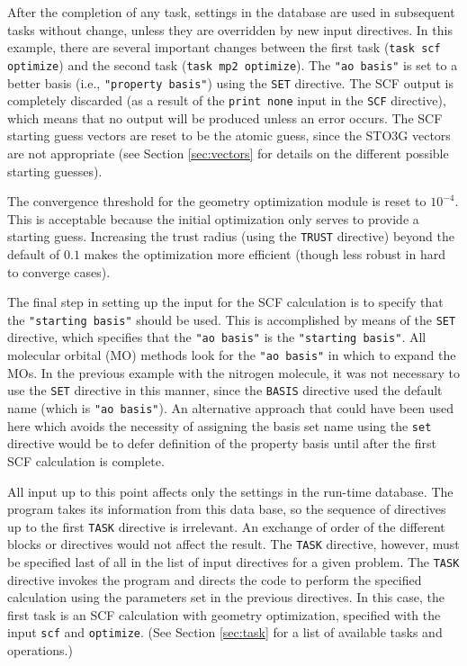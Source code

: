 After the completion of any task, settings in the database are used
in subsequent tasks without change, unless they are overridden by new
input directives.  In this example, there are several important
changes between the first task (\verb+task scf optimize+) and the
second task (\verb+task mp2 optimize+).  The {\tt "ao basis"} is set
to a better basis (i.e., {\tt "property basis"}) using the \verb+SET+
directive.  The SCF output is completely discarded (as a result of the
{\tt print none} input in the {\tt SCF} directive), which means that
no output will be produced unless an error occurs.  The SCF starting
guess vectors are reset to be the atomic guess, since the STO3G
vectors are not appropriate (see Section \ref{sec:vectors} for
details on the different possible starting guesses).

The convergence threshold for the geometry optimization
module is reset to $10^{-4}$.  This is
acceptable because the initial optimization only serves to provide a
starting guess.  Increasing the trust radius (using the \verb+TRUST+
directive) beyond the default of $0.1$ makes the optimization more
efficient (though less robust in hard to converge cases).

The final step in setting up the input for the SCF calculation is to
specify that the \verb+"starting basis"+ should be used.  This is
accomplished by means of the \verb+SET+ directive, which specifies that 
the \verb+"ao basis"+ is the \verb+"starting basis"+.  All molecular
orbital (MO) methods look for the \verb+"ao basis"+ in which to expand the
MOs.    In the previous example with the nitrogen molecule, it was not 
necessary to use the \verb+SET+ directive in this manner, since the 
\verb+BASIS+ directive used the default name (which is \verb+"ao basis"+).
An alternative approach that could have been used here which avoids the 
necessity of assigning the basis set name using the
\verb+set+ directive would be to defer definition of the property basis
until after the first SCF calculation is complete. 

All input up to this point affects only the settings in the run-time
database.  The program takes its information from this data base, so
the sequence of directives up to the first \verb+TASK+ directive is
irrelevant.  An exchange of order of the different blocks or
directives would not affect the result.  The {\tt TASK} directive,
however, must be specified last of all in the list of input directives
for a given problem.  The {\tt TASK} directive invokes the program and
directs the code to perform the specified calculation using the
parameters set in the previous directives. In this case, the first
task is an SCF calculation with geometry optimization, specified with
the input {\tt scf} and {\tt optimize}.  (See Section \ref{sec:task}
for a list of available tasks and operations.)

